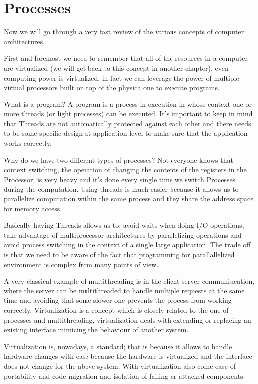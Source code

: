 \chapter{Processes}
Now we will go through a very fast review of the various concepts of computer architectures.

First and foremost we need to remember that all of the resources in a computer are virtualized (we will get back to this concept in another chapter), even computing power is virtualized, in fact we can leverage the power of multiple virtual processors built on top of the physica one to execute programs.

What is a program? A program is a process in execution in whose context one or more threads (or light processes) can be executed. It's important to keep in mind that Threads are not automatically protected against each other and there needs to be some specific design at application level to make sure that the application works correctly.

Why do we have two different types of processes? Not everyone knows that context switching, the operation of changing the contents of the registers in the Processor, is very heavy and it's done every single time we switch Processes during the computation. Using threads is much easier because it allows us to parallelize computation within the same process and they share the address space for memory access.

Basically having Threads allows us to: avoid waits when doing I/O operations, take advantage of multiprocessor architectures by parallelizing operations and avoid process switching in the context of a single large application. The trade off is that we need to be aware of the fact that programming for parallallelized environment is complex from many points of view.

A very classical example of multithreading is in the client-server communiucation, where the server can be multithreaded to handle multiple requests at the same time and avoiding that some slower one prevents the process from working correctly. Virtualization is a concept which is closely related to the one of processes and multithreading, virtualization deals with extending or replacing an existing interface mimicing the behaviour of another system.

Virtualization is, nowadays, a standard; that is because it allows to handle hardware changes with ease because the hardware is virtualized and the interface does not change for the above system. With virtualization also come ease of portability and code migration and isolation of failing or attacked components.

